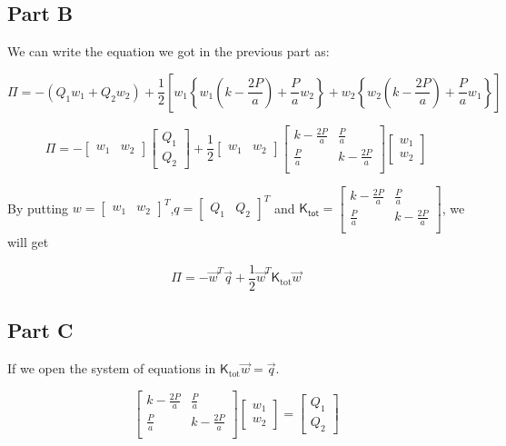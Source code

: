 \documentclass[12pt,a4paper]{article}
\newcommand{\mat}[1]{\boldsymbol { \mathsf{#1}} }
\begin{document}
\subsection{Part B}
We can write the equation we got in the previous part as:

$$\Pi =  - (Q_1w_1 + Q_2w_2)  + \frac{1}{2}\left[ w_1\left\{ w_1\left(k-\frac{2P}{a}\right)+ \frac{P}{a}w_2\right\} +
w_2\left\{ w_2\left(k-\frac{2P}{a}\right)+ \frac{P}{a}w_1\right\}\right]$$

$$\Pi =
-\begin{bmatrix}w_1 & w_2\end{bmatrix}\begin{bmatrix}Q_1\\ Q_2\end{bmatrix} + \frac{1}{2}\begin{bmatrix}w_1 & w_2\end{bmatrix}\begin{bmatrix}
k-\frac{2P}{a} & \frac{P}{a}\\
\frac{P}{a} & k-\frac{2P}{a}\\
\end{bmatrix}\begin{bmatrix}w_1\\ w_2\end{bmatrix}
$$

By putting $w = \begin{bmatrix}w_1 & w_2\end{bmatrix}^T$,$q = \begin{bmatrix}Q_1 & Q_2\end{bmatrix}^T$ and $\mat{K_{tot}} = \begin{bmatrix}
k-\frac{2P}{a} & \frac{P}{a}\\
\frac{P}{a} & k-\frac{2P}{a}\\
\end{bmatrix}$, we will get 

$$\Pi = -\Vec{w}^T\Vec{q} + \frac{1}{2}\Vec{w}^T\mat{K}_{\text{tot}}\Vec{w}$$

\subsection{Part C}
If we open the system of equations in $\mat{K}_{\text{tot}}\Vec{w} = \Vec{q}$.

$$
\begin{bmatrix}
k-\frac{2P}{a} & \frac{P}{a}\\
\frac{P}{a} & k-\frac{2P}{a}\\
\end{bmatrix}\begin{bmatrix}w_1\\ w_2\end{bmatrix} = \begin{bmatrix}Q_1 \\ Q_2\end{bmatrix}
$$
\end{document}
